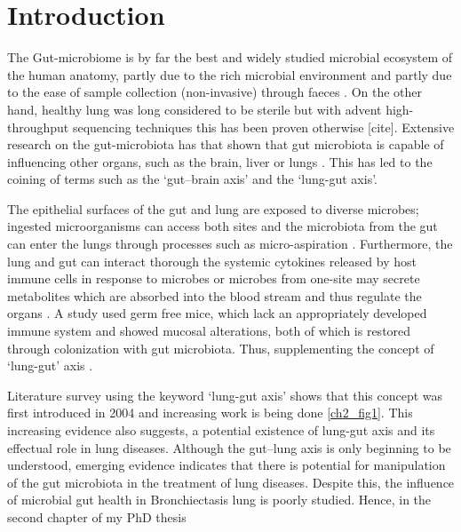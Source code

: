 \section{Introduction}

The Gut-microbiome is by far the best and widely studied microbial ecosystem of the human anatomy, partly due to the rich microbial environment and partly due to the ease of sample collection (non-invasive) through faeces \cite{Budden2017}. On the other hand, healthy lung was long considered to be sterile but with advent high-throughput sequencing techniques this has been proven otherwise [cite]. Extensive research on the gut-microbiota has that shown that gut microbiota is capable of influencing other organs, such as the brain, liver or lungs \cite{Bell2019}. This has led to the coining of terms such as the `gut–brain axis' and the `lung-gut axis'. 

The epithelial surfaces of the gut and lung are exposed to diverse microbes; ingested microorganisms can access both sites and the microbiota from the gut can enter the lungs through processes such as micro-aspiration \cite{Budden2017}. Furthermore, the lung and gut can interact thorough the systemic cytokines released by host immune cells in response to microbes or  microbes from one-site may secrete metabolites which are absorbed into the blood stream and thus regulate the organs \cite{Dang2019}. A study used germ free mice, which lack an appropriately developed immune system and showed mucosal alterations, both of which is restored through colonization with gut microbiota. Thus, supplementing the concept of `lung-gut' axis \cite{Budden2017}. 

Literature survey using the keyword `lung-gut axis' shows that this concept was first introduced in 2004 and increasing work is being done \ref{ch2_fig1}. This increasing evidence also suggests, a potential existence of lung-gut axis and its effectual role in lung diseases. Although the gut–lung axis is only beginning to be understood, emerging evidence indicates that there is potential for manipulation of the gut microbiota in the treatment of lung diseases. Despite this, the influence of microbial gut health in Bronchiectasis lung is poorly studied. Hence, in the second chapter of my PhD thesis


